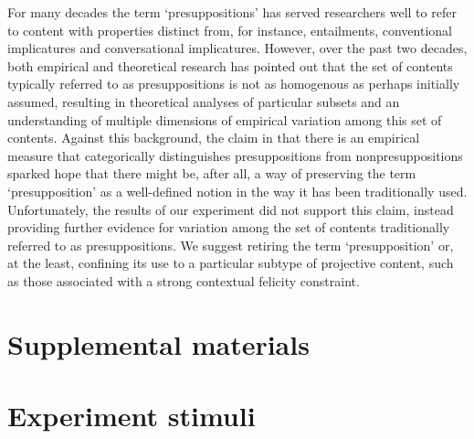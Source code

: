 \documentclass[11pt,fleqn]{article}
\newcommand{\6}{\mbox{$[\hspace*{-.6mm}[$}}
\newcommand{\9}{\mbox{$]\hspace*{-.6mm}]$}}
\begin{document}
For many decades the term `presuppositions' has served researchers well to refer to content with properties distinct from, for instance, entailments, conventional implicatures and conversational implicatures. However, over the past two decades, both empirical and theoretical research has pointed out that the set of contents typically referred to as presuppositions is not as homogenous as perhaps initially assumed, resulting in theoretical analyses of particular subsets and an understanding of multiple dimensions of empirical variation among this set of contents. Against this background, the claim in \citealt{mandelkern-etal2020} that there is an empirical measure that categorically distinguishes presuppositions from nonpresuppositions sparked hope that there might be, after all, a way of preserving the term `presupposition' as a well-defined notion in the way it has been traditionally used.  Unfortunately, the results of our experiment did not support this claim, instead providing further evidence for variation among the set of contents traditionally referred to as presuppositions. We suggest retiring the term `presupposition' or, at the least, confining its use to a particular subtype of projective content, such as those associated with a strong contextual felicity constraint.






%


\newpage

\section*{Supplemental materials}

\appendix

\setcounter{page}{1}

\setcounter{table}{0}
\renewcommand{\thetable}{A\arabic{table}}

\setcounter{figure}{0}
\renewcommand{\thefigure}{A\arabic{figure}}

\section{Experiment stimuli}\label{a:clauses}
\end{document}
